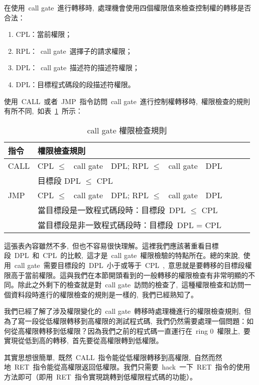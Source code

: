 在使用~call gate~進行轉移時,~處理機會使用四個權限值來檢查控制權的轉移是否合法：

\begin{enumerate}
\item CPL：當前權限；
\item RPL：~call gate~選擇子的請求權限；
\item DPL：~call gate~描述符的描述符權限；
\item DPL：目標程式碼段的段描述符權限。
\end{enumerate}

使用~CALL~或者~JMP~指令訪問~call gate~進行控制權轉移時,~權限檢查的規則有所不同,~如表~\ref{callgate_rules}~所示：

\begin{table}[htdp]
\caption{call gate 權限檢查規則}\label{callgate_rules}
\begin{center}
\begin{tabular}{lllll}
\hline
\textbf{指令} & \textbf{權限檢查規則}\\
\hline
CALL & CPL $\le$ ~call gate~~DPL; RPL $\le$ ~call gate~~DPL\\
     & 目標段 DPL $\le$ CPL\\
\hline
JMP  & CPL $\le$ ~call gate~~DPL; RPL $\le$ ~call gate~~DPL\\
     & 當目標段是一致程式碼段時：目標段~DPL $\le$ CPL\\
     & 當目標段是非一致程式碼段時：目標段~DPL = CPL\\
\hline
\end{tabular}
\end{center}
\end{table}

這張表內容雖然不多,~但也不容易很快理解。這裡我們應該著重看目標段~DPL~和~CPL~的比較,~這才是~call gate~權限檢驗的特點所在。總的來說,~使用~call gate~需要目標段的~DPL~小于或等于~CPL~,~意思就是要轉移的目標段權限高于當前權限。這與我們在本節開頭看到的一般轉移的權限檢查有非常明顯的不同。除此之外剩下的檢查就是對~call gate~訪問的檢查了,~這種權限檢查和訪問一個資料段時進行的權限檢查的規則是一樣的,~我們已經熟知了。

我們已經了解了涉及權限變化的~call gate~轉移時處理機進行的權限檢查規則,~但為了寫一段從低權限轉移到高權限的測試程式碼,~我們仍然需要處理一個問題：如何從高權限轉移到低權限？因為我們之前的程式碼一直運行在~ring 0~權限上,~要實現從低到高的轉移,~首先要從高權限轉到低權限。

其實思想很簡單,~既然~CALL~指令能從低權限轉移到高權限,~自然而然地~RET~指令能從高權限返回低權限。我們只需要~hack~一下~RET~指令的使用方法即可（即用~RET~指令實現跳轉到低權限程式碼的功能）。

